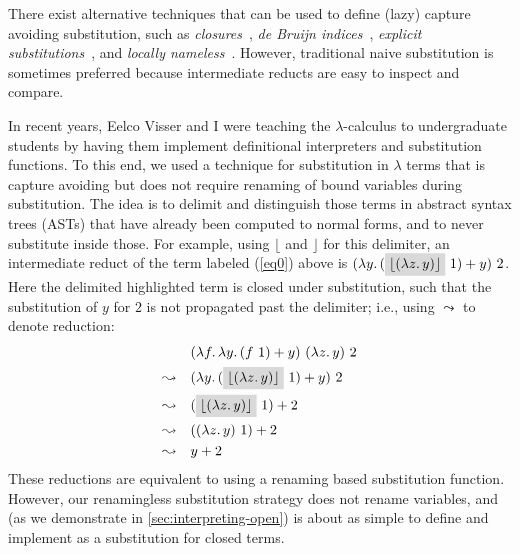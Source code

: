 There exist alternative techniques that can be used to define (lazy) capture avoiding substitution, such as \emph{closures}~\cite{Landin64}, \emph{de Bruijn indices}~\cite{de_Bruijn_1972}, \emph{explicit substitutions}~\cite{AbadiCCL91}, and \emph{locally nameless}~\cite{Chargueraud12}.
However, traditional naive substitution is sometimes preferred because intermediate reducts are easy to inspect and compare.

In recent years, Eelco Visser and I were teaching the $\lambda$-calculus to undergraduate students by having them implement definitional interpreters and substitution functions.
To this end, we used a technique for substitution in $\lambda$ terms that is capture avoiding but does not require renaming of bound variables during substitution.
The idea is to delimit and distinguish those terms in abstract syntax trees (ASTs) that have already been computed to normal forms, and to never substitute inside those.
For example, using $\lfloor$ and $\rfloor$ for this delimiter, an intermediate reduct of the term labeled (\ref{eq0}) above is $(\lambda y.\, (\colorbox{gray!30}{$\lfloor (\lambda z.\, y) \rfloor$}\ 1) + y)\ 2$.
Here the delimited \colorbox{gray!30}{highlighted} term is closed under substitution, such that the substitution of $y$ for $2$ is not propagated past the delimiter; i.e., using $\leadsto$ to denote reduction:
\begin{align*}
  & (\lambda f .\, \lambda y .\, (f\ 1) + y)\ (\lambda z .\, y)\ 2
  \\
  \leadsto\quad & (\lambda y.\, (\colorbox{gray!30}{$\lfloor (\lambda z.\, y) \rfloor$}\ 1) + y)\ 2
  \\
  \leadsto\quad & (\colorbox{gray!30}{$\lfloor (\lambda z.\, y) \rfloor$}\ 1) + 2
  \\
  \leadsto\quad & ((\lambda z.\, y)\ 1) + 2
  \\
  \leadsto\quad & y + 2
\end{align*}
%
These reductions are equivalent to using a renaming based substitution function.
However, our renamingless substitution strategy does not rename variables, and (as we demonstrate in \cref{sec:interpreting-open}) is about as simple to define and implement as a substitution for closed terms.

